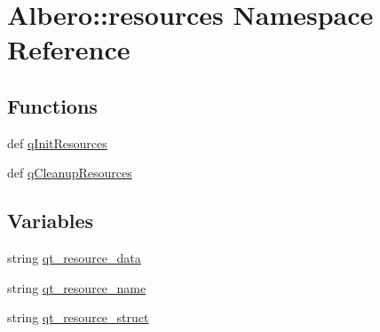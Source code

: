 \hypertarget{namespaceAlbero_1_1resources}{
\section{Albero::resources Namespace Reference}
\label{namespaceAlbero_1_1resources}
}
\subsection*{Functions}
\begin{DoxyCompactItemize}
\item 
def \hyperlink{namespaceAlbero_1_1resources_aae81464552678ca05f6c6d398881e3e7}{qInitResources}
\item 
def \hyperlink{namespaceAlbero_1_1resources_a55d40b69f1622c8844fc295c774941c5}{qCleanupResources}
\end{DoxyCompactItemize}
\subsection*{Variables}
\begin{DoxyCompactItemize}
\item 
string \hyperlink{namespaceAlbero_1_1resources_aa2ca3975dada28c52119cbc990507ad2}{qt\_\-resource\_\-data}
\item 
string \hyperlink{namespaceAlbero_1_1resources_a0de85fc01ee82b4c93eda6188dd6cd6c}{qt\_\-resource\_\-name}
\item 
string \hyperlink{namespaceAlbero_1_1resources_a2a80e241c281cf6718630921b7f2885a}{qt\_\-resource\_\-struct}
\end{DoxyCompactItemize}


